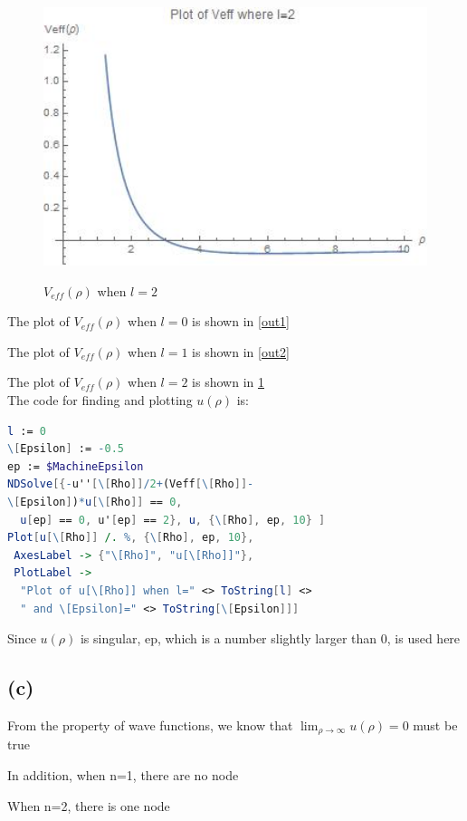 \documentclass[12pt]{article}
\begin{document}
\begin{spacing}{2.0}
\begin{figure}
  \centering
  \includegraphics[width=4.5in]{out3}\\
  \caption{$V_{eff}(\rho)$ when $l=2$}\label{out3}
\end{figure}

The plot of $V_{eff}(\rho)$ when $l=0$ is shown in \ref{out1}

The plot of $V_{eff}(\rho)$ when $l=1$ is shown in \ref{out2}

The plot of $V_{eff}(\rho)$ when $l=2$ is shown in \ref{out3}\\

The code for finding and plotting $u(\rho)$ is:

\begin{lstlisting}[language=Mathematica,frame=single]
l := 0
\[Epsilon] := -0.5
ep := $MachineEpsilon
NDSolve[{-u''[\[Rho]]/2+(Veff[\[Rho]]-
\[Epsilon])*u[\[Rho]] == 0,
  u[ep] == 0, u'[ep] == 2}, u, {\[Rho], ep, 10} ]
Plot[u[\[Rho]] /. %, {\[Rho], ep, 10},
 AxesLabel -> {"\[Rho]", "u[\[Rho]]"},
 PlotLabel ->
  "Plot of u[\[Rho]] when l=" <> ToString[l] <>
  " and \[Epsilon]=" <> ToString[\[Epsilon]]]
\end{lstlisting}

Since $u(\rho)$ is singular, ep, which is a number slightly larger than 0, is used here

\subsection*{(c)}
From the property of wave functions, we know that $\lim_{\rho \rightarrow \infty} u(\rho)=0$ must be true

In addition, when n=1, there are no node

When n=2, there is one node


\end{spacing}
\end{document}
